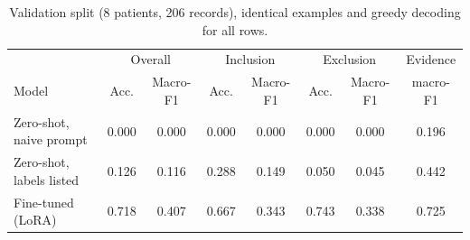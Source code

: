\begin{table}[t]\centering\small
\caption{Validation split (8 patients, 206 records), identical examples and greedy decoding for all rows.}\label{tab:val}
\begin{tabular}{lccccccc}\toprule
 & \multicolumn{2}{c}{Overall} & \multicolumn{2}{c}{Inclusion} & \multicolumn{2}{c}{Exclusion} & Evidence\\
Model & Acc. & Macro-F1 & Acc. & Macro-F1 & Acc. & Macro-F1 & macro-F1\\\midrule
Zero-shot, naive prompt & 0.000 & 0.000 & 0.000 & 0.000 & 0.000 & 0.000 & 0.196 \\
Zero-shot, labels listed & 0.126 & 0.116 & 0.288 & 0.149 & 0.050 & 0.045 & 0.442 \\
Fine-tuned (LoRA) & 0.718 & 0.407 & 0.667 & 0.343 & 0.743 & 0.338 & 0.725 \\
\bottomrule\end{tabular}\end{table}
